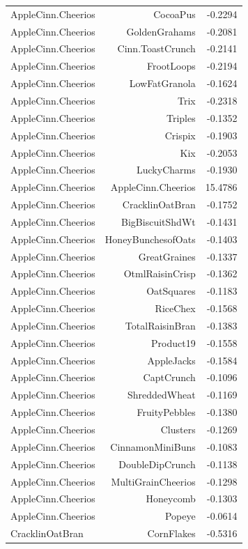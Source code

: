 \begin{longtable}{@{}lrr@{}}
AppleCinn.Cheerios & CocoaPus & -0.2294 \\
AppleCinn.Cheerios & GoldenGrahams & -0.2081 \\
AppleCinn.Cheerios & Cinn.ToastCrunch & -0.2141 \\
AppleCinn.Cheerios & FrootLoops & -0.2194 \\
AppleCinn.Cheerios & LowFatGranola & -0.1624 \\
AppleCinn.Cheerios & Trix & -0.2318 \\
AppleCinn.Cheerios & Triples & -0.1352 \\
AppleCinn.Cheerios & Crispix & -0.1903 \\
AppleCinn.Cheerios & Kix & -0.2053 \\
AppleCinn.Cheerios & LuckyCharms & -0.1930 \\
AppleCinn.Cheerios & AppleCinn.Cheerios & 15.4786 \\
AppleCinn.Cheerios & CracklinOatBran & -0.1752 \\
AppleCinn.Cheerios & BigBiscuitShdWt & -0.1431 \\
AppleCinn.Cheerios & HoneyBunchesofOats & -0.1403 \\
AppleCinn.Cheerios & GreatGraines & -0.1337 \\
AppleCinn.Cheerios & OtmlRaisinCrisp & -0.1362 \\
AppleCinn.Cheerios & OatSquares & -0.1183 \\
AppleCinn.Cheerios & RiceChex & -0.1568 \\
AppleCinn.Cheerios & TotalRaisinBran & -0.1383 \\
AppleCinn.Cheerios & Product19 & -0.1558 \\
AppleCinn.Cheerios & AppleJacks & -0.1584 \\
AppleCinn.Cheerios & CaptCrunch & -0.1096 \\
AppleCinn.Cheerios & ShreddedWheat & -0.1169 \\
AppleCinn.Cheerios & FruityPebbles & -0.1380 \\
AppleCinn.Cheerios & Clusters & -0.1269 \\
AppleCinn.Cheerios & CinnamonMiniBuns & -0.1083 \\
AppleCinn.Cheerios & DoubleDipCrunch & -0.1138 \\
AppleCinn.Cheerios & MultiGrainCheerios & -0.1298 \\
AppleCinn.Cheerios & Honeycomb & -0.1303 \\
AppleCinn.Cheerios & Popeye & -0.0614 \\
CracklinOatBran & CornFlakes & -0.5316 \\

\end{longtable}
